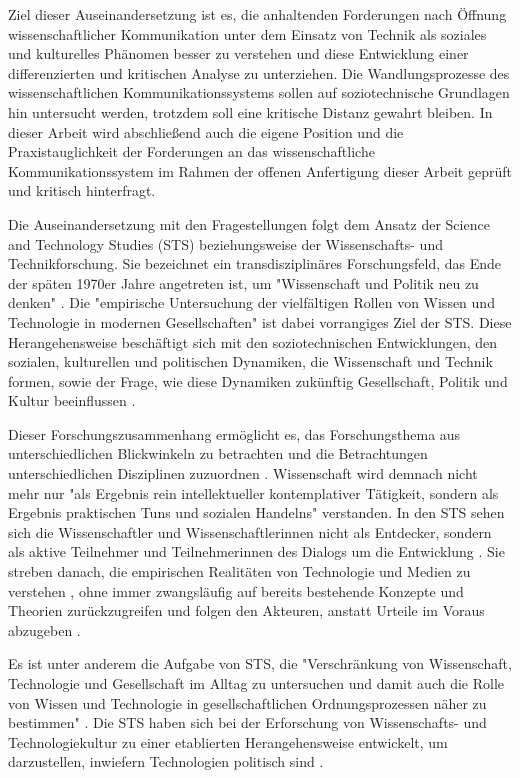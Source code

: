 Ziel dieser Auseinandersetzung ist es, die anhaltenden Forderungen nach Öffnung wissenschaftlicher Kommunikation unter dem Einsatz von Technik als soziales und kulturelles Phänomen besser zu verstehen und diese Entwicklung einer differenzierten und kritischen Analyse zu unterziehen. Die Wandlungsprozesse des wissenschaftlichen Kommunikationssystems sollen auf soziotechnische Grundlagen hin untersucht werden, trotzdem soll eine kritische Distanz gewahrt bleiben. In dieser Arbeit wird abschließend auch die eigene Position und die Praxistauglichkeit der Forderungen an das wissenschaftliche Kommunikationssystem im Rahmen der offenen Anfertigung dieser Arbeit geprüft und kritisch hinterfragt.

Die Auseinandersetzung mit den Fragestellungen folgt dem Ansatz der Science and Technology Studies (STS) beziehungsweise der Wissenschafts- und Technikforschung. Sie bezeichnet ein transdisziplinäres Forschungsfeld, das Ende der späten 1970er Jahre angetreten ist, um "Wissenschaft und Politik neu zu denken" \cite[:92]{Potthast_2010}. Die "empirische Untersuchung der vielfältigen Rollen von Wissen und Technologie in modernen Gesellschaften" \cite[:11]{Beck_2014} ist dabei vorrangiges Ziel der STS. Diese Herangehensweise beschäftigt sich mit den soziotechnischen Entwicklungen, den sozialen, kulturellen und politischen Dynamiken, die Wissenschaft und Technik formen, sowie der Frage, wie diese Dynamiken zukünftig Gesellschaft, Politik und Kultur beeinflussen \cite{Potthast_2010} \cite{Brown_2014}.

Dieser Forschungszusammenhang ermöglicht es, das Forschungsthema aus unterschiedlichen Blickwinkeln zu betrachten und die Betrachtungen unterschiedlichen Disziplinen zuzuordnen \cite{Beck_2014} \cite{Potthast_2010}. Wissenschaft wird demnach nicht mehr nur "als Ergebnis rein intellektueller kontemplativer Tätigkeit, sondern als Ergebnis praktischen Tuns und sozialen Handelns" \cite[:13]{Beck_2014} verstanden. In den STS sehen sich die Wissenschaftler und Wissenschaftlerinnen nicht als Entdecker, sondern als aktive Teilnehmer und Teilnehmerinnen des Dialogs um die Entwicklung \cite{MacKenzie_1999}. Sie streben danach, die empirischen Realitäten von Technologie und Medien zu verstehen \cite{Kelty_2014}, ohne immer zwangsläufig auf bereits bestehende Konzepte und Theorien zurückzugreifen \cite[:8]{Brown_2014} und folgen den Akteuren, anstatt Urteile im Voraus abzugeben \cite[:584]{Irwin_2008}.

Es ist unter anderem die Aufgabe von STS, die "Verschränkung von Wissenschaft, Technologie und Gesellschaft im Alltag zu untersuchen und damit auch die Rolle von Wissen und Technologie in gesellschaftlichen Ordnungsprozessen näher zu bestimmen" \cite[:9]{Beck_2014}. Die STS haben sich bei der Erforschung von Wissenschafts- und Technologiekultur zu einer etablierten Herangehensweise entwickelt, um darzustellen, inwiefern Technologien politisch sind \cite{Kelty_2014}.

